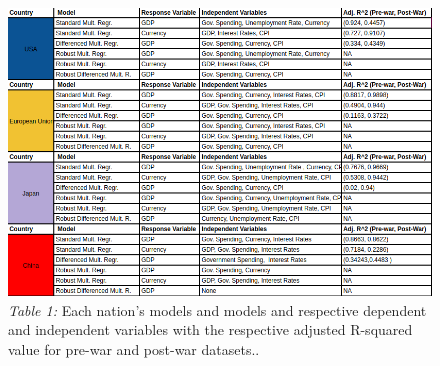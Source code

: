 \documentclass[11pt,regno]{amsart}
\theoremstyle{plain}
\numberwithin{equation}{section}
\begin{document}
\begin{figure}[h!]  
\caption*{\textit{Table 1:} Each nation's models and models and respective dependent and independent variables with the respective adjusted R-squared value for pre-war and post-war datasets..}
\includegraphics[scale = 0.4]{summary_table.png} 
\end{figure}
\end{document}

